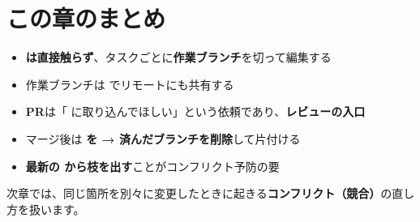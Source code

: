 \section*{この章のまとめ}

\begin{itemize}[leftmargin=1.4em]
  \item \textbf{ は直接触らず}、タスクごとに\textbf{作業ブランチ}を切って編集する
  \item 作業ブランチは  でリモートにも共有する
  \item \textbf{PR}は「 に取り込んでほしい」という依頼であり、\textbf{レビューの入口}
  \item マージ後は \textbf{ を  → 済んだブランチを削除}して片付ける
  \item \textbf{最新の  から枝を出す}ことがコンフリクト予防の要
\end{itemize}

次章では、同じ箇所を別々に変更したときに起きる\textbf{コンフリクト（競合）}の直し方を扱います。
